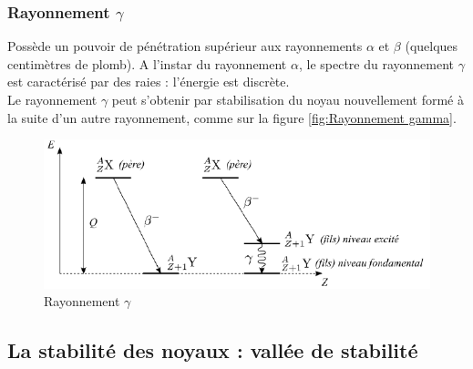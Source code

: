 \subsubsection{Rayonnement $\gamma$}


Possède un pouvoir de pénétration supérieur aux rayonnements $\alpha$ et $\beta$ (quelques centimètres de plomb). A l'instar du rayonnement $\alpha$, le spectre du rayonnement $\gamma$ est caractérisé par des raies : l'énergie est discrète.\\
Le rayonnement $\gamma$ peut s'obtenir par stabilisation du noyau nouvellement formé à la suite d'un autre rayonnement, comme sur la figure \eqref{fig:Rayonnement gamma}.
\begin{figure}[H]
    \centering
    \includegraphics[scale=0.7]{Images1/gamma.PNG}
    \caption{Rayonnement $\gamma$}
    \label{fig:Rayonnement gamma}
\end{figure}


\subsection{La stabilité des noyaux : vallée de stabilité}

